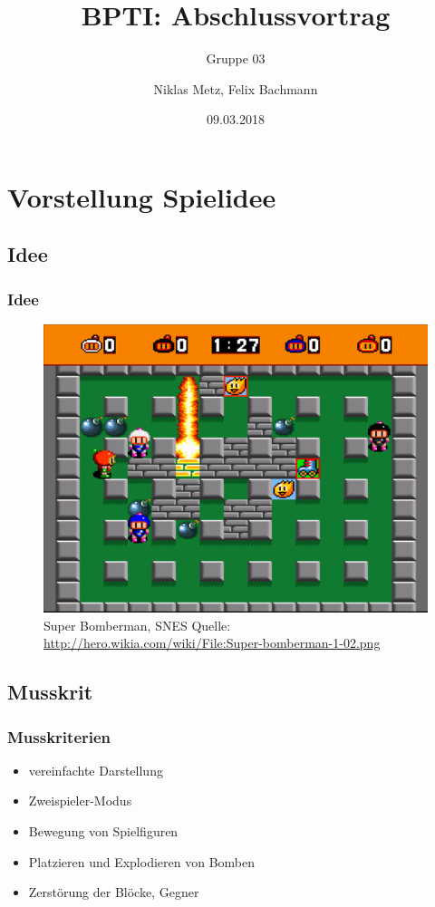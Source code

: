 \documentclass[18pt]{beamer}
\title[BPTI]{BPTI: Abschlussvortrag}
\subtitle{Gruppe 03}
\author{Niklas Metz, Felix Bachmann}
\date{09.03.2018}
\institute{}
\begin{document}

\begin{frame}
\titlepage
\end{frame}

\section{Vorstellung Spielidee}
		\subsection{Idee}
		\begin{frame}
			\frametitle{Idee}
				\begin{figure}[H]
					\centering
					\includegraphics[scale=0.35]{Bilder/bomberman.png}
					\centering
					\caption*{Super Bomberman, SNES \newline Quelle: \url{http://hero.wikia.com/wiki/File:Super-bomberman-1-02.png} }
				\end{figure}
		\end{frame}
		
		\subsection{Musskrit}
		\begin{frame}
			\frametitle{Musskriterien}
				\begin{itemize}
					\item vereinfachte Darstellung
					\item Zweispieler-Modus
					\item Bewegung von Spielfiguren
					\item Platzieren und Explodieren von Bomben
					\item Zerstörung der Blöcke, Gegner
				\end{itemize}
		\end{frame}
	
\end{document}
